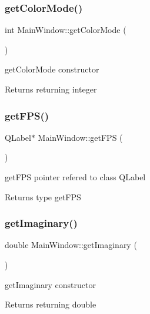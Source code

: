 \subsubsection{\texorpdfstring{get\+Color\+Mode()}{getColorMode()}}
{\footnotesize\ttfamily int Main\+Window\+::get\+Color\+Mode (\begin{DoxyParamCaption}{ }\end{DoxyParamCaption})}



get\+Color\+Mode constructor 

\begin{DoxyReturn}{Returns}
returning integer 
\end{DoxyReturn}
\mbox{\label{classMainWindow_adc53673d5fb73e021c7bde51a3b32055}} 
\subsubsection{\texorpdfstring{get\+F\+P\+S()}{getFPS()}}
{\footnotesize\ttfamily Q\+Label$\ast$ Main\+Window\+::get\+F\+PS (\begin{DoxyParamCaption}{ }\end{DoxyParamCaption})}



get\+F\+PS pointer refered to class Q\+Label 

\begin{DoxyReturn}{Returns}
type get\+F\+PS 
\end{DoxyReturn}
\mbox{\label{classMainWindow_a53e364bc9d8029ce6cac0170985fca81}} 
\subsubsection{\texorpdfstring{get\+Imaginary()}{getImaginary()}}
{\footnotesize\ttfamily double Main\+Window\+::get\+Imaginary (\begin{DoxyParamCaption}{ }\end{DoxyParamCaption})}



get\+Imaginary constructor 

\begin{DoxyReturn}{Returns}
returning double 
\end{DoxyReturn}
\mbox{\label{classMainWindow_a43d3aa3fbe5ea12500ad8933534a1424}} 
